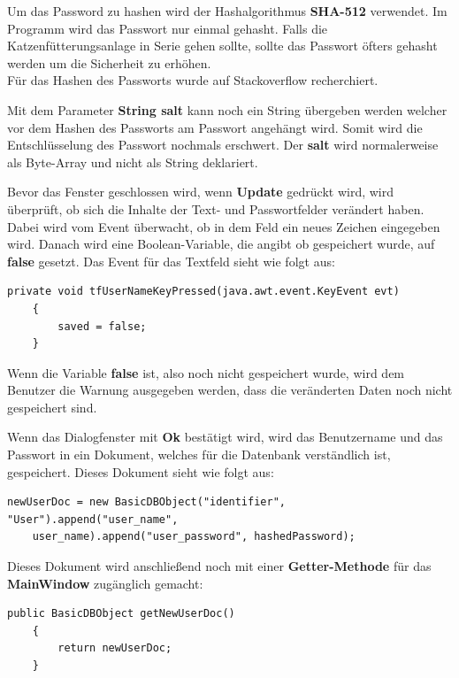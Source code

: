 Um das Password zu hashen wird der Hashalgorithmus \textbf{SHA-512} verwendet. Im Programm wird das Passwort nur einmal gehasht. Falls die Katzenfütterungsanlage in Serie gehen sollte, sollte das Passwort öfters gehasht werden um die Sicherheit zu erhöhen.
\\ Für das Hashen des Passworts wurde auf Stackoverflow  recherchiert.

Mit dem Parameter \textbf{String salt} kann noch ein String übergeben werden welcher vor dem Hashen des Passworts am Passwort angehängt wird. Somit wird die Entschlüsselung des Passwort nochmals erschwert. Der  \textbf{salt} wird normalerweise als Byte-Array und nicht als String deklariert.

\vspace{10pt}

Bevor das Fenster geschlossen wird, wenn \textbf{Update} gedrückt wird, wird überprüft, ob sich die Inhalte der Text- und Passwortfelder verändert haben. Dabei wird vom Event überwacht, ob in dem Feld ein neues Zeichen eingegeben wird. Danach wird eine Boolean-Variable, die angibt ob gespeichert wurde, auf \textbf{false} gesetzt. Das Event für das Textfeld sieht wie folgt aus:
\begin{lstlisting}[style=Javastyle, caption=Textfeld Event]
	private void tfUserNameKeyPressed(java.awt.event.KeyEvent evt)                                       
	{                                           
		saved = false;
	}
\end{lstlisting}
Wenn die Variable \textbf{false} ist, also noch nicht gespeichert wurde, wird dem Benutzer die Warnung ausgegeben werden, dass die veränderten Daten noch nicht gespeichert sind.

\vspace{10pt}

Wenn das Dialogfenster mit \textbf{Ok} bestätigt wird, wird das Benutzername und das Passwort in ein Dokument, welches für die Datenbank verständlich ist, gespeichert. Dieses Dokument sieht wie folgt aus:
\begin{lstlisting}[style=Javastyle, caption=Benutzerdokument]
newUserDoc = new BasicDBObject("identifier", "User").append("user_name", 
	user_name).append("user_password", hashedPassword);
\end{lstlisting}

Dieses Dokument wird anschließend noch mit einer \textbf{Getter-Methode} für das  \textbf{MainWindow} zugänglich gemacht:
\begin{lstlisting}[style=Javastyle, caption=Benutzerdokument Getter-Methode]
	public BasicDBObject getNewUserDoc()
	{
		return newUserDoc;
	}
\end{lstlisting}

